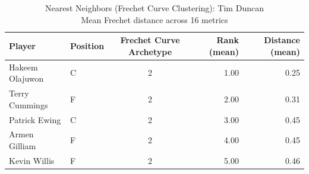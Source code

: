 \begin{table}[t]
\caption*{
{\fontsize{20}{25} Nearest Neighbors (Frechet Curve Clustering): Tim Duncan\fontsize{12}{15}\selectfont } \\ 
{\fontsize{14}{17}\selectfont  Mean Frechet distance across 16 metrics\fontsize{12}{15}\selectfont }
} 
\fontsize{12.0pt}{14.0pt}\selectfont
\begin{tabular*}{\linewidth}{@{\extracolsep{\fill}}llcrr}
\toprule
Player & Position & Frechet Curve Archetype & Rank (mean) & Distance (mean) \\ 
\midrule\addlinespace[2.5pt]
Hakeem Olajuwon & C & 2 & 1.00 & 0.25 \\ 
Terry Cummings & F & 2 & 2.00 & 0.31 \\ 
Patrick Ewing & C & 2 & 3.00 & 0.45 \\ 
Armen Gilliam & F & 2 & 4.00 & 0.45 \\ 
Kevin Willis & F & 2 & 5.00 & 0.46 \\ 
\bottomrule
\end{tabular*}
\end{table}

